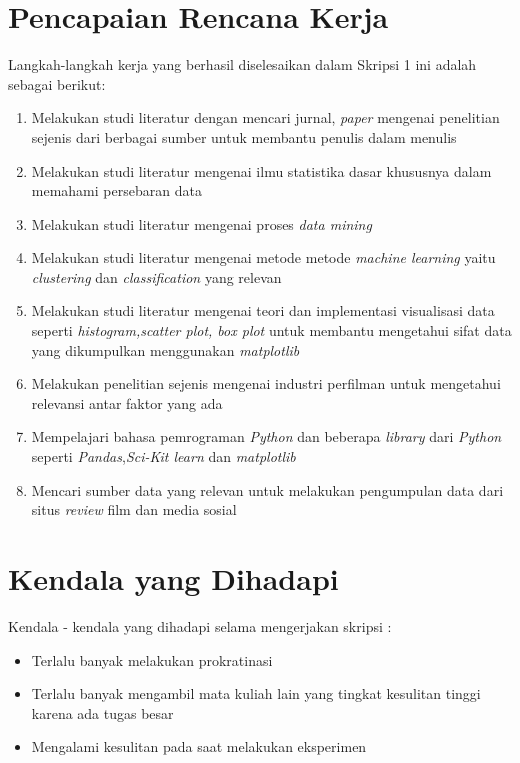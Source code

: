 \documentclass[a4paper,twoside]{article}
\begin{document}
\section{Pencapaian Rencana Kerja}
Langkah-langkah kerja yang berhasil diselesaikan dalam Skripsi 1 ini adalah sebagai berikut:
\begin{enumerate}
	\item Melakukan studi literatur dengan mencari jurnal, \textit{paper} mengenai penelitian sejenis dari berbagai sumber untuk membantu penulis dalam menulis  
	\item Melakukan studi literatur mengenai ilmu statistika dasar khususnya dalam memahami persebaran data 
		\item Melakukan studi literatur mengenai proses \textit{data mining}  
		\item Melakukan studi literatur mengenai metode metode \textit{machine learning} yaitu \textit{clustering} dan \textit{classification} yang relevan 
		\item Melakukan studi literatur mengenai teori dan implementasi visualisasi data seperti \textit{histogram,scatter plot, box plot} untuk membantu mengetahui sifat data yang dikumpulkan menggunakan \textit{matplotlib} 
		\item Melakukan penelitian sejenis mengenai industri perfilman untuk mengetahui relevansi antar faktor yang ada  
		\item Mempelajari bahasa pemrograman \textit{Python} dan beberapa \textit{library} dari \textit{Python}  seperti \textit{Pandas},\textit{Sci-Kit learn} dan \textit{matplotlib} 
		\item Mencari sumber data yang relevan untuk melakukan pengumpulan data dari situs \textit{review} film dan media sosial 
\end{enumerate}



\section{Kendala yang Dihadapi}
Kendala - kendala yang dihadapi selama mengerjakan skripsi :
\begin{itemize}
	\item Terlalu banyak melakukan prokratinasi
	\item Terlalu banyak mengambil mata kuliah lain yang tingkat kesulitan tinggi karena ada tugas besar
	\item Mengalami kesulitan pada saat melakukan eksperimen
\end{itemize}
\end{document}
